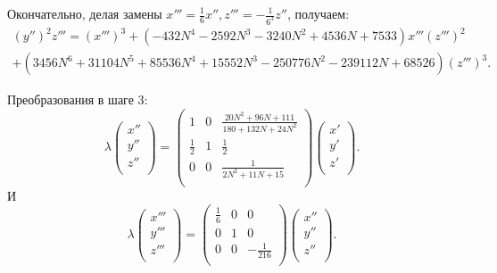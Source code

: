 \begin{itemize}[leftmargin=0.6cm]
    Окончательно, делая замены \(x''' = \frac{1}{6} x'', z''' =
    -\frac{1}{6^3} z''\), получаем:
    \begin{multline*}
        \left( y'' \right)^2 z''' = \left( x''' \right)^3  +  \left(-432 N^4
        - 2592 N^3 - 3240 N^2 + 4536 N + 7533\right) x''' \left( z'''
        \right)^2 \\ 
        +  \left(3456 N^6 + 31104 N^5 + 85536 N^4 + 15552 N^3 -
        250776 N^2 - 239112 N + 68526 \right) \left( z''' \right)^3
    .\end{multline*}

    Преобразования в шаге 3:
    \[
    \lambda \begin{pmatrix}
        x'' \\
        y'' \\
        z'' \\
    \end{pmatrix} = 
    \begin{pmatrix}
        1 & 0 & \frac{20 N^2 + 96 N + 111}{180 + 132 N + 24 N^2} \\
        \frac{1}{2} & 1 & \frac{1}{2} \\
        0 & 0 & \frac{1}{2 N^2 + 11 N + 15} \\
    \end{pmatrix}
    \begin{pmatrix}
        x' \\
        y' \\
        z' \\
    \end{pmatrix}
    .\] 
    И
    \[
    \lambda \begin{pmatrix}
        x''' \\
        y''' \\
        z''' \\
    \end{pmatrix} = 
    \begin{pmatrix}
        \frac{1}{6} & 0 & 0 \\
        0 & 1 & 0 \\
        0 & 0 & -\frac{1}{216} \\
    \end{pmatrix}
    \begin{pmatrix}
        x'' \\
        y'' \\
        z'' \\
    \end{pmatrix}
    .\] 
\end{itemize}

